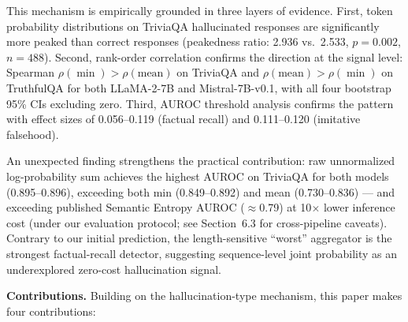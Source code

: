 This mechanism is empirically grounded in three layers of evidence. First, token probability distributions on TriviaQA hallucinated responses are significantly more peaked than correct responses (peakedness ratio: 2.936 vs.\ 2.533, $p = 0.002$, $n = 488$). Second, rank-order correlation confirms the direction at the signal level: Spearman $\rho(\min) > \rho(\text{mean})$ on TriviaQA and $\rho(\text{mean}) > \rho(\min)$ on TruthfulQA for both LLaMA-2-7B and Mistral-7B-v0.1, with all four bootstrap 95\% CIs excluding zero. Third, AUROC threshold analysis confirms the pattern with effect sizes of 0.056--0.119 (factual recall) and 0.111--0.120 (imitative falsehood).

An unexpected finding strengthens the practical contribution: raw unnormalized log-probability sum achieves the highest AUROC on TriviaQA for both models (0.895--0.896), exceeding both min (0.849--0.892) and mean (0.730--0.836) --- and exceeding published Semantic Entropy AUROC ($\approx$0.79) \citep{farquhar2024} at 10$\times$ lower inference cost (under our evaluation protocol; see Section~6.3 for cross-pipeline caveats). Contrary to our initial prediction, the length-sensitive ``worst'' aggregator is the strongest factual-recall detector, suggesting sequence-level joint probability as an underexplored zero-cost hallucination signal.

\textbf{Contributions.} Building on the hallucination-type mechanism, this paper makes four contributions:

